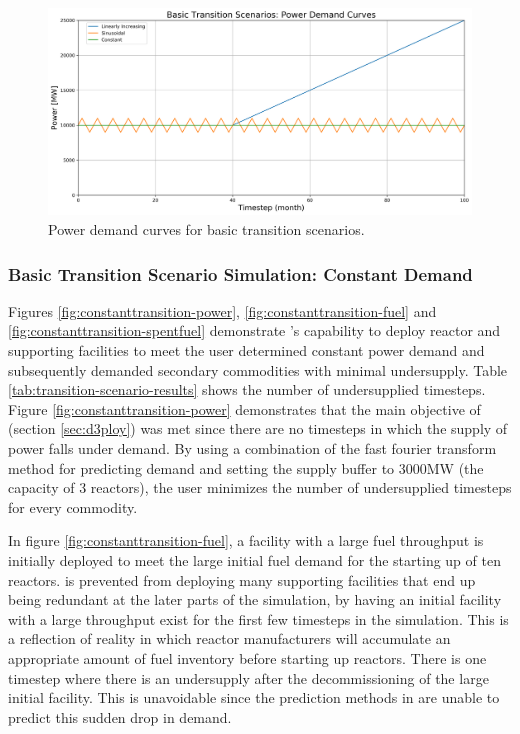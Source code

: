     \begin{figure}[]
        \begin{center}
            \includegraphics[scale=0.37]{./figures/powerplots.png}
        \end{center}
            \caption{Power demand curves for basic transition scenarios.}
        \label{fig:powerplots}
    \end{figure}

\subsubsection{\textbf{Basic Transition Scenario Simulation: Constant Demand}}
Figures \ref{fig:constanttransition-power}, \ref{fig:constanttransition-fuel}
and \ref{fig:constanttransition-spentfuel} demonstrate \deploy's capability 
to deploy reactor and supporting facilities to meet the user 
determined constant power demand and subsequently demanded 
secondary commodities with minimal undersupply. 
Table \ref{tab:transition-scenario-results} shows the number of 
undersupplied timesteps. 
Figure \ref{fig:constanttransition-power} demonstrates that
the main objective of \deploy (section \ref{sec:d3ploy}) 
was met since there are no timesteps
in which the supply of power falls under demand.
By using a combination of the fast fourier transform method for 
predicting demand and setting the supply buffer to 3000MW 
(the capacity of 3 reactors), the user minimizes the number of 
undersupplied timesteps for every commodity.

In figure \ref{fig:constanttransition-fuel},
a facility with a large fuel throughput is initially
deployed to meet the large initial fuel demand for the starting
up of ten reactors. 
\deploy is prevented from deploying many supporting
facilities that end up being redundant at the later parts of 
the simulation, by having an initial facility with a large throughput
exist for the first few timesteps in the simulation.
This is a reflection of reality in which reactor manufacturers will 
accumulate an appropriate amount of fuel inventory before starting 
up reactors. 
There is one timestep where there is an undersupply after the 
decommissioning of the large initial facility.  
This is unavoidable since the prediction methods in \deploy are 
unable to predict this sudden drop in demand. 

